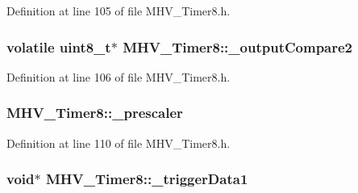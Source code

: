 \-Definition at line 105 of file \-M\-H\-V\-\_\-\-Timer8.\-h.

\hypertarget{class_m_h_v___timer8_a81be7741280c03ccfa31d22a20b5609b}{
\subsubsection[{\-\_\-output\-Compare2}]{\setlength{\rightskip}{0pt plus 5cm}volatile uint8\-\_\-t$\ast$ {\bf \-M\-H\-V\-\_\-\-Timer8\-::\-\_\-output\-Compare2}}}
\label{class_m_h_v___timer8_a81be7741280c03ccfa31d22a20b5609b}


\-Definition at line 106 of file \-M\-H\-V\-\_\-\-Timer8.\-h.

\hypertarget{class_m_h_v___timer8_a2d610b4bbd5aef2db6a4062dbd063aba}{
\subsubsection[{\-\_\-prescaler}]{ {\bf \-M\-H\-V\-\_\-\-Timer8\-::\-\_\-prescaler}}}
\label{class_m_h_v___timer8_a2d610b4bbd5aef2db6a4062dbd063aba}


\-Definition at line 110 of file \-M\-H\-V\-\_\-\-Timer8.\-h.

\hypertarget{class_m_h_v___timer8_a1e3fc760ea6b757afb648804750bca93}{
\subsubsection[{\-\_\-trigger\-Data1}]{\setlength{\rightskip}{0pt plus 5cm}void$\ast$ {\bf \-M\-H\-V\-\_\-\-Timer8\-::\-\_\-trigger\-Data1}}}
\label{class_m_h_v___timer8_a1e3fc760ea6b757afb648804750bca93}


